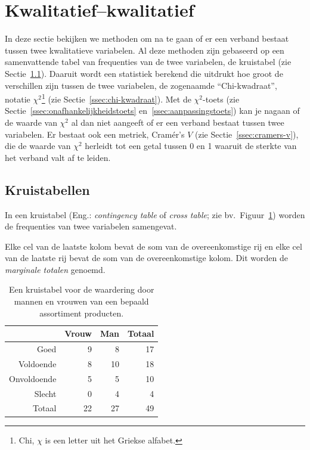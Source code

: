 \section{Kwalitatief--kwalitatief}
\label{sec:kwalitatief-kwalitatief}

In deze sectie bekijken we methoden om na te gaan of er een verband bestaat tussen twee kwalitatieve variabelen. Al deze methoden zijn gebaseerd op een samenvattende tabel van frequenties van de twee variabelen, de kruistabel (zie Sectie~\ref{ssec:kruistabellen}). Daaruit wordt een statistiek berekend die uitdrukt hoe groot de verschillen zijn tussen de twee variabelen, de zogenaamde ``Chi-kwadraat'', notatie $\chi^2$\footnote{Chi, $\chi$ is een letter uit het Griekse alfabet.} (zie Sectie~\ref{ssec:chi-kwadraat}). Met de $\chi^2$-toets (zie Sectie~\ref{ssec:onafhankelijkheidstoets} en~\ref{ssec:aanpassingstoets}) kan je nagaan of de waarde van $\chi^2$ al dan niet aangeeft of er een verband bestaat tussen twee variabelen. Er bestaat ook een metriek, Cramér's $V$ (zie Sectie~\ref{ssec:cramers-v}), die de waarde van $\chi^2$ herleidt tot een getal tussen 0 en 1 waaruit de sterkte van het verband valt af te leiden.

\subsection{Kruistabellen}
\label{ssec:kruistabellen}

\begin{definition}[Kruistabel]
  In een kruistabel (Eng.: \emph{contingency table} of \emph{cross table}; zie bv.~Figuur~\ref{tab:kruistabel0}) worden de frequenties van twee variabelen samengevat.
  
  Elke cel van de laatste kolom bevat de som van de overeenkomstige rij en elke cel van de laatste rij bevat de som van de overeenkomstige kolom. Dit worden de \emph{marginale totalen} genoemd.
\end{definition}

\begin{table} \centering
  \begin{tabular}{@{}rrrr}
    \toprule
                & Vrouw & Man & Totaal \\
    \midrule
           Goed &     9 &   8 &     17 \\
      Voldoende &     8 &  10 &     18 \\
    Onvoldoende &     5 &   5 &     10 \\
         Slecht &     0 &   4 &      4 \\
         Totaal &    22 &  27 &     49 \\
    \bottomrule
  \end{tabular}
  \caption{Een kruistabel voor de waardering door mannen en vrouwen van een bepaald assortiment producten.}
  \label{tab:kruistabel0}
\end{table}

